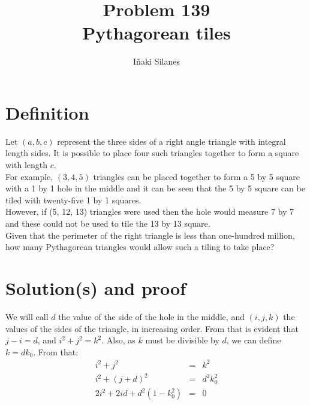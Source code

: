 \documentclass[english]{article}
\begin{document}
\newcommand{\mc}{\multicolumn}
\newcommand{\mr}{\multirow}
\newcommand{\cw}{\columnwidth}
\newcommand{\ig}[2]{\texttt{[image: \#2]}}

\title{Problem 139\\Pythagorean tiles}
\author{I\~naki Silanes}
\maketitle

\section{Definition}

Let $(a, b, c)$ represent the three sides of a right angle triangle with integral length sides. It is possible to place four such triangles together to form a square with length $c$.\\

For example, $(3, 4, 5)$ triangles can be placed together to form a 5 by 5 square with a 1 by 1 hole in the middle and it can be seen that the 5 by 5 square can be tiled with twenty-five 1 by 1 squares.\\

However, if (5, 12, 13) triangles were used then the hole would measure 7 by 7 and these could not be used to tile the 13 by 13 square.\\

Given that the perimeter of the right triangle is less than one-hundred million, how many Pythagorean triangles would allow such a tiling to take place?

\section{Solution(s) and proof}

We will call $d$ the value of the side of the hole in the middle, and $(i, j, k)$ the values of the sides of the triangle, in increasing order. From that is evident that $j - i = d$, and $i^2 + j^2 = k^2$. Also, as $k$ must be divisible by $d$, we can define $k = d k_0$. From that:\\

\begin{eqnarray}
i^2 + j^2 & = & k^2 \\
i^2 + (j+d)^2 & = & d^2 k_0^2 \\
2 i^2 + 2id + d^2(1-k_0^2) & = & 0 \\
\end{eqnarray}
\end{document}
